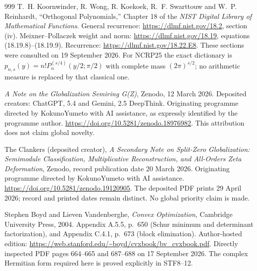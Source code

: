 \begin{thebibliography}{999}
T.~H. Koornwinder, R. Wong, R. Koekoek, R.~F. Swarttouw and
W.~P. Reinhardt, ``Orthogonal Polynomials,'' Chapter 18 of the
\emph{NIST Digital Library of Mathematical Functions}.
General recurrence: \url{https://dlmf.nist.gov/18.2}, section (iv).
Meixner--Pollaczek weight and norm:
\url{https://dlmf.nist.gov/18.19}, equations (18.19.8)--(18.19.9).
Recurrence: \url{https://dlmf.nist.gov/18.22.E8}.
These sections were consulted on 19 September 2026.
For NCRP25 the exact dictionary is
$p_{n,s}(y)=n!P_n^{(s/4)}(y/2;\pi/2)$ with complete mass
$(2\pi)^{s/2}$; no arithmetic measure is replaced by that classical one.

\emph{A Note on the Globalization Semiring G(Z)}, Zenodo,
12 March 2026. Deposited creators: ChatGPT, 5.4 and Gemini, 2.5 DeepThink.
Originating programme directed by KokunoYumeto with AI assistance,
as expressly identified by the programme author.
\url{https://doi.org/10.5281/zenodo.18976982}.
This attribution does not claim global novelty.

The Clankers (deposited creator), \emph{A Secondary Note on Split-Zero
Globalization: Semimodule Classification, Multiplicative Reconstruction,
and All-Orders Zeta Deformation}, Zenodo, record publication date
20 March 2026. Originating programme directed by KokunoYumeto
with AI assistance. \url{https://doi.org/10.5281/zenodo.19120905}.
The deposited PDF prints 29 April 2026; record and printed dates
remain distinct. No global priority claim is made.

Stephen Boyd and Lieven Vandenberghe,
\emph{Convex Optimization}, Cambridge University Press, 2004.
Appendix A.5.5, p.~650 (Schur minimum and determinant factorization),
and Appendix C.4.1, p.~673 (block elimination).
Author-hosted edition: \url{https://web.stanford.edu/~boyd/cvxbook/bv_cvxbook.pdf}.
Directly inspected PDF pages 664--665 and 687--688 on 17 September 2026.
The complex Hermitian form required here is proved explicitly in STF8--12.




\end{thebibliography}

